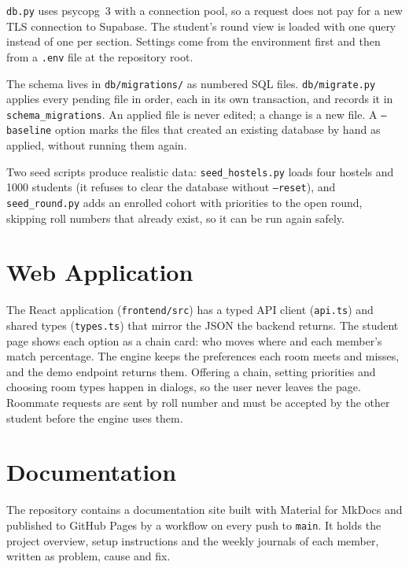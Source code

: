 \texttt{db.py} uses psycopg~3 with a connection pool, so a request does
not pay for a new TLS connection to Supabase. The student's round view
is loaded with one query instead of one per section. Settings come from
the environment first and then from a \texttt{.env} file at the
repository root.

The schema lives in \texttt{db/migrations/} as numbered SQL files.
\texttt{db/migrate.py} applies every pending file in order, each in its
own transaction, and records it in \texttt{schema\_migrations}. An
applied file is never edited; a change is a new file. A
\texttt{--baseline} option marks the files that created an existing
database by hand as applied, without running them again.

Two seed scripts produce realistic data: \texttt{seed\_hostels.py} loads
four hostels and 1000 students (it refuses to clear the database without
\texttt{--reset}), and \texttt{seed\_round.py} adds an enrolled cohort
with priorities to the open round, skipping roll numbers that already
exist, so it can be run again safely.

\section{Web Application}

The React application (\texttt{frontend/src}) has a typed API client
(\texttt{api.ts}) and shared types (\texttt{types.ts}) that mirror the
JSON the backend returns. The student page shows each option as a chain
card: who moves where and each member's match percentage. The engine
keeps the preferences each room meets and misses, and the demo endpoint
returns them. Offering a chain, setting priorities
and choosing room types happen in dialogs, so the user never leaves the
page. Roommate requests are sent by roll number and must be accepted by
the other student before the engine uses them.

\section{Documentation}

The repository contains a documentation site built with Material for
MkDocs and published to GitHub Pages by a workflow on every push to
\texttt{main}. It holds the project overview, setup instructions and the
weekly journals of each member, written as problem, cause and fix.
